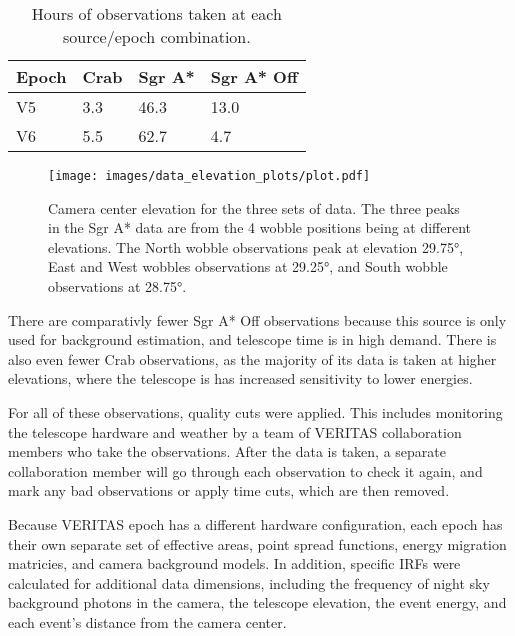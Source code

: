   \begin{table}[]
    \centering
    \caption{Hours of observations taken at each source/epoch combination.}
    \label{tab:observation_times}
    \begin{tabular}{|l|l|l|l|}
      \hline
      \textbf{Epoch} & \textbf{Crab} & \textbf{Sgr A*} & \textbf{Sgr A* Off} \\ \hline
      V5             & 3.3           & 46.3            & 13.0                \\ \hline
      V6             & 5.5           & 62.7            & 4.7                 \\ \hline
    \end{tabular}
  \end{table}


  \begin{figure}[ht]
    \centering
    \texttt{[image: images/data\_elevation\_plots/plot.pdf]}
    \caption[VERITAS Data Elevation Exposure]{
      Camera center elevation for the three sets of data.
      The three peaks in the Sgr A* data are from the 4 wobble positions being at different elevations.
      The North wobble observations peak at elevation \nicetilde\ang{29.75}, East and West wobbles observations at \nicetilde\ang{29.25}, and South wobble observations at \nicetilde\ang{28.75}.
    }
    \label{fig:datapointingelevations}
  \end{figure}

  There are comparativly fewer Sgr A* Off observations because this source is only used for background estimation, and telescope time is in high demand.
  There is also even fewer Crab observations, as the majority of its data is taken at higher elevations, where the telescope is has increased sensitivity to lower energies.
  
  For all of these observations, quality cuts were applied.
  This includes monitoring the telescope hardware and weather by a team of VERITAS collaboration members who take the observations.
  After the data is taken, a separate collaboration member will go through each observation to check it again, and mark any bad observations or apply time cuts, which are then removed.

  Because VERITAS epoch has a different hardware configuration, each epoch has their own separate set of effective areas, point spread functions, energy migration matricies, and camera background models.
  In addition, specific IRFs were calculated for additional data dimensions, including the frequency of night sky background photons in the camera, the telescope elevation, the event energy, and each event's distance from the camera center.
  
